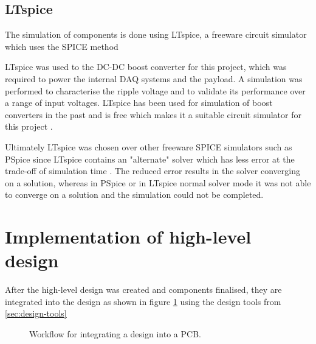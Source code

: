 \documentclass{report}
\newcommand*{\fullref}[1]{\hyperref[{#1}]{\ref*{#1} \nameref*{#1}}}
\begin{document}
\subsection{LTspice}

The simulation of components is done using LTspice, a freeware circuit simulator which uses the SPICE method

LTspice was used to the DC-DC boost converter for this project, which was required to power the internal DAQ systems and the payload. A simulation was performed to characterise the ripple voltage and to validate its performance over a range of input voltages. LTspice has been used for simulation of boost converters in the past and is free which makes it a suitable circuit simulator for this project \cite{giesselmann2019modeling}.

Ultimately LTspice was chosen over other freeware SPICE simulators such as PSpice since LTspice contains an "alternate" solver which has less error at the trade-off of simulation time \cite{ltspice2022}. The reduced error results in the solver converging on a solution, whereas in PSpice or in LTspice normal solver mode it was not able to converge on a solution and the simulation could not be completed.



\section{Implementation of high-level design}

After the high-level design was created and components finalised, they are integrated into the design as shown in figure \ref{fig:implementation-workflow} using the design tools from \fullref{sec:design-tools}

\begin{figure}[H]
  \centering
  
  \caption{Workflow for integrating a design into a PCB.}
  \label{fig:implementation-workflow}
\end{figure}
\end{document}

